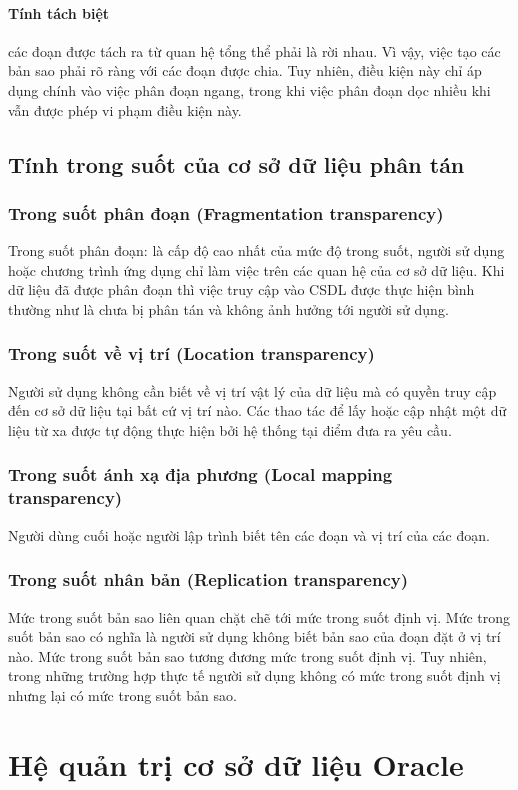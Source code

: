 \documentclass[12pt,a4paper]{report}
\begin{document}
\subsubsection{Tính tách biệt}
các đoạn được tách ra từ quan hệ tổng thể phải là rời nhau. Vì vậy, việc tạo các bản sao phải rõ ràng với các đoạn được chia. Tuy nhiên, điều kiện này chỉ áp dụng chính vào việc phân đoạn ngang, trong khi việc phân đoạn dọc nhiều khi vẫn được phép vi phạm điều kiện này.
\section{Tính trong suốt của cơ sở dữ liệu phân tán}
\subsection{Trong suốt phân đoạn (Fragmentation transparency)}
Trong suốt phân đoạn: là cấp độ cao nhất của mức độ trong suốt, người sử dụng hoặc chương 
trình ứng dụng chỉ làm việc trên các quan hệ của cơ sở dữ liệu. Khi dữ liệu đã được phân đoạn thì việc truy cập vào CSDL được thực hiện bình thường như là chưa bị phân tán và không ảnh hưởng tới người sử dụng. 
\subsection{Trong suốt về vị trí (Location transparency)}
Người sử dụng không cần biết về vị trí vật lý của dữ liệu mà có quyền truy cập đến cơ sở dữ liệu tại bất cứ vị trí nào. Các thao tác để lấy hoặc cập nhật một dữ liệu từ xa được tự động thực hiện bởi hệ thống tại điểm đưa ra yêu cầu. 
\subsection{Trong suốt ánh xạ địa phương (Local mapping transparency)}
Người dùng cuối hoặc người lập trình biết tên các đoạn và vị trí của các đoạn.
\subsection{Trong suốt nhân bản (Replication transparency)}
Mức trong suốt bản sao liên quan chặt chẽ tới mức trong suốt định vị. Mức trong suốt bản sao có nghĩa là người sử dụng không biết bản sao của đoạn đặt ở vị trí nào. Mức trong suốt bản sao tương đương mức trong suốt định vị. Tuy nhiên, trong những trường hợp thực tế người sử dụng không có mức trong suốt định vị nhưng lại có mức trong suốt bản sao.

\chapter{Hệ quản trị cơ sở dữ liệu Oracle}
\end{document}
